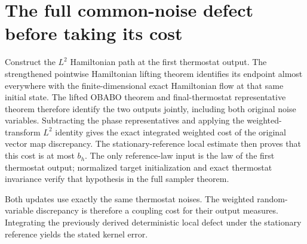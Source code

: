 \documentclass[11pt,a4paper]{article}
\begin{document}
\section{\texorpdfstring{The full common-noise defect before taking its cost}{The full common-noise defect before taking its cost}}


Construct the \(L^{2}\) Hamiltonian path at the first thermostat output. The strengthened pointwise Hamiltonian lifting theorem identifies its endpoint almost everywhere with the finite-dimensional exact Hamiltonian flow at that same initial state. The lifted OBABO theorem and final-thermostat representative theorem therefore identify the two outputs jointly, including both original noise variables. Subtracting the phase representatives and applying the weighted-transform \(L^{2}\) identity gives the exact integrated weighted cost of the original vector map discrepancy. The stationary-reference local estimate then proves that this cost is at most \(b_h\). The only reference-law input is the law of the first thermostat output; normalized target initialization and exact thermostat invariance verify that hypothesis in the full sampler theorem.



Both updates use exactly the same thermostat noises. The weighted random-variable discrepancy is therefore a coupling cost for their output measures. Integrating the previously derived deterministic local defect under the stationary reference yields the stated kernel error.
\end{document}
